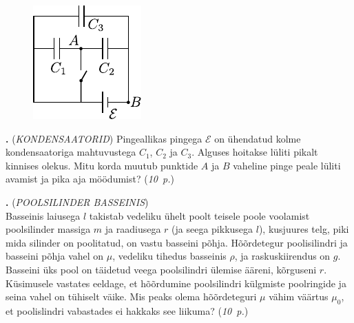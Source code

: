 \documentclass[11pt,a5paper]{article}
\newcommand{\numb}[1]{\vspace{5pt}\textbf{\large #1}}
\newcommand{\nimi}[1]{(\textsl{\small #1})}
\newcommand{\punktid}[1]{(\emph{#1~p.})}
\newcommand{\autor}[1]{}
\newcounter{ylesanne}
\newcommand{\yl}[1]{\addtocounter{ylesanne}{1}\numb{\theylesanne.} \nimi{#1} \newblock{}}
\begin{document}
	
	\begin{figure}
		\vspace{-5pt}
		\includegraphics[width=\linewidth]{kondensaator}
	\end{figure}
	\yl{KONDENSAATORID} Pingeallikas pingega $\mathcal E$ on ühendatud kolme kondensaatoriga mahtuvustega $C_1$, $C_2$ ja $C_3$. Alguses hoitakse lüliti pikalt kinnises olekus. Mitu korda muutub punktide $A$ ja $B$ vaheline pinge peale lüliti avamist ja pika aja möödumist? 
	\punktid{10} \autor{Taavet Kalda}
	
	
	\yl{POOLSILINDER BASSEINIS}\\
	Basseinis laiusega $l$ takistab vedeliku ühelt poolt teisele poole voolamist poolsilinder massiga $m$ ja raadiusega $r$ (ja seega pikkusega $l$), kusjuures telg, piki mida silinder on poolitatud, on vastu basseini põhja. Hõõrdetegur poolisilindri ja basseini põhja vahel on $\mu$, vedeliku tihedus basseinis $\rho$, ja raskuskiirendus on $g$. Basseini üks pool on täidetud veega poolsilindri ülemise ääreni, kõrguseni $r$. Küsimusele vastates eeldage, et hõõrdumine poolsilindri külgmiste poolringide ja seina vahel on tühiselt väike. Mis peaks olema hõõrdeteguri $\mu$ vähim väärtus $\mu_0$, et poolislindri vabastades ei hakkaks see liikuma?
	\punktid{10} \autor{Krister Kasemaa}
	
\end{document}

